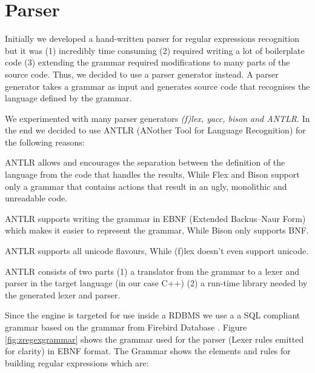 \section{Parser}\label{section:parser}
Initially we developed a hand-written parser for regular expressions recognition but it was (1) incredibly time consuming (2) required writing a lot of boilerplate code (3) extending the grammar required modifications to many parts of the source code. Thus, we decided to use a parser generator instead. A parser generator takes a grammar as input and generates source code that recognises the language defined by the grammar.

We experimented with many parser generators \textit{(f)lex, yacc, bison and ANTLR}. In the end we decided to use ANTLR (ANother Tool for Language Recognition) for the following reasons:

\begin{packed_enum}
    \item ANTLR allows and encourages the separation between the definition of the language from the code that handles the results, While Flex and Bison support only a grammar that contains actions that result in an ugly, monolithic and unreadable code.
    \item ANTLR supports writing the grammar in EBNF (Extended Backus–Naur Form) which makes it easier to represent the grammar, While Bison only supports BNF.
    \item ANTLR supports all unicode flavours, While (f)lex doesn't even support unicode.
\end{packed_enum}

\noindent ANTLR consists of two parts (1) a translator from the grammar to a lexer and parser in the target language (in our case C++) (2) a run-time library needed by the generated lexer and parser.

\noindent Since the engine is targeted for use inside a RDBMS we use a a SQL compliant grammar based on the grammar from Firebird Database \cite{2022Firebird}. Figure \ref{fig:zregexgrammar} shows the grammar used for the parser (Lexer rules emitted for clarity) in EBNF format. The Grammar shows the elements and rules for building regular expressions which are:

